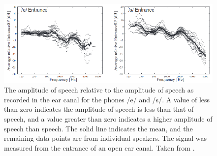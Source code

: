 \begin{figure}[h!]
\DIFaddendFL \includegraphics[width=1\textwidth]{figure/BCrelAC_e_s.png}
\caption{The amplitude of \DIFdelbeginFL {}\DIFdelendFL \DIFaddbeginFL {}\DIFaddendFL speech relative to the amplitude of \DIFdelbeginFL {}\DIFdelendFL \DIFaddbeginFL {}\DIFaddendFL speech as recorded in the ear canal for the phones /e/ and /s/.  A value of less than zero indicates the amplitude of \DIFdelbeginFL {}\DIFdelendFL \DIFaddbeginFL {}\DIFaddendFL speech is less than that of \DIFdelbeginFL {}\DIFdelendFL \DIFaddbeginFL {}\DIFaddendFL speech, and a value greater than zero indicates a higher amplitude of \DIFdelbeginFL {}\DIFdelendFL \DIFaddbeginFL {}\DIFaddendFL speech than \DIFdelbeginFL {}\DIFdelendFL \DIFaddbeginFL {}\DIFaddendFL speech. The solid line indicates the mean, and the remaining data points are from individual speakers.  The signal was measured from the entrance of an open ear canal.  Taken from \cite{reinfeldt:10}.}
\label{BCrelAC}
\end{figure}


